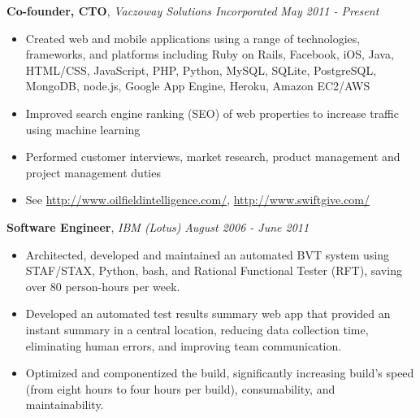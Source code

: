 \documentclass[9pt]{article}
\newenvironment{changemargin}[2]{%
  \begin{list}{}{%
    \setlength{\topsep}{0pt}%
    \setlength{\leftmargin}{#1}%
    \setlength{\rightmargin}{#2}%
    \setlength{\listparindent}{\parindent}%
    \setlength{\itemindent}{\parindent}%
    \setlength{\parsep}{\parskip}%
  }%
  \item[]}{\end{list}
}
\newcommand{\jobdescription}[1]{
	\begin{changemargin}{0.15in}{0.15in}
    \smallskip
		{#1}
    \medskip
	\end{changemargin}
}
\newcommand{\jobtitle}[3]{
	\textbf{#1}, \emph{#2} \hfill \emph{#3}\\
}
\newenvironment{body} {
	\vspace*{-16pt}
	\begin{changemargin}{-0.25in}{-0.5in}
  }	
	{\end{changemargin}
}
\begin{document}
\begin{body}
  \jobtitle{Co-founder, CTO}{Vaczoway Solutions Incorporated}{May 2011 - Present}
  \jobdescription{
  	\begin{itemize} \itemsep -0pt  %
  		\item Created web and mobile applications using a range of technologies, frameworks, and platforms including Ruby on Rails, Facebook, iOS, Java, HTML/CSS, JavaScript, PHP, Python, MySQL, SQLite, PostgreSQL, MongoDB, node.js, Google App Engine, Heroku, Amazon EC2/AWS
  		\item Improved search engine ranking (SEO) of web properties to increase traffic using machine learning
  		\item Performed customer interviews, market research, product management and project management duties
      \item See \url{http://www.oilfieldintelligence.com/}, \url{http://www.swiftgive.com/}
  	\end{itemize}
  }



	\jobtitle{Software Engineer}{IBM (Lotus)}{August 2006 - June 2011}
  \jobdescription{
  	\begin{itemize} \itemsep -0pt  %
  		\item Architected, developed and maintained an automated BVT system using STAF/STAX, Python, bash, and Rational Functional Tester (RFT), saving over 80 person-hours per week.
      \item Developed an automated test results summary web app that provided an instant summary in a central location, reducing data collection time, eliminating human errors, and improving team communication. 
      \item Optimized and componentized the build, significantly increasing build’s speed (from eight hours to four hours per build), consumability, and maintainability.
  	\end{itemize}
  }


\end{body}
\end{document}
